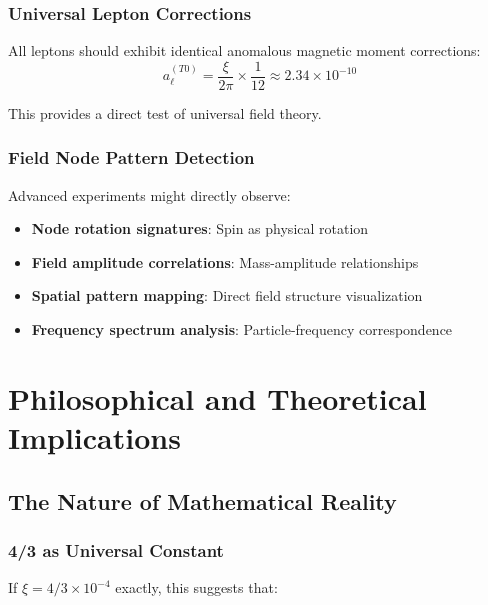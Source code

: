 \documentclass[12pt,a4paper]{article}
\newcommand{\xipar}{\ensuremath{\xi}}
\newcommand{\mypi}{\ensuremath{\pi}}
\newcommand{\mytimes}{\ensuremath{\times}}
\newcommand{\myapprox}{\ensuremath{\approx}}
\begin{document}
	\subsubsection{Universal Lepton Corrections}
	\label{subsubsec:universal_lepton_corrections}
	
	All leptons should exhibit identical anomalous magnetic moment corrections:
	\begin{equation}
		a_{\ell}^{(T0)} = \frac{\xipar}{2\mypi} \mytimes \frac{1}{12} \myapprox 2.34 \mytimes 10^{-10}
		\label{eq:universal_lepton_prediction}
	\end{equation}
	
	This provides a direct test of universal field theory.
	
	\subsubsection{Field Node Pattern Detection}
	\label{subsubsec:node_pattern_detection}
	
	Advanced experiments might directly observe:
	\begin{itemize}
		\item \textbf{Node rotation signatures}: Spin as physical rotation
		\item \textbf{Field amplitude correlations}: Mass-amplitude relationships
		\item \textbf{Spatial pattern mapping}: Direct field structure visualization
		\item \textbf{Frequency spectrum analysis}: Particle-frequency correspondence
	\end{itemize}
	
	\section{Philosophical and Theoretical Implications}
	\label{sec:philosophical_implications}
	
	\subsection{The Nature of Mathematical Reality}
	\label{subsec:mathematical_reality}
	
	\subsubsection{4/3 as Universal Constant}
	\label{subsubsec:four_thirds_universal}
	
	If $\xipar = 4/3 \mytimes 10^{-4}$ exactly, this suggests that:
	
\end{document}
